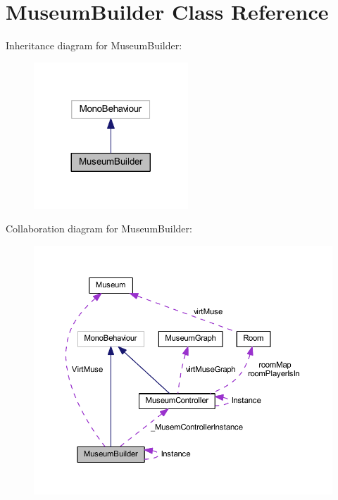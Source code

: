 \hypertarget{class_museum_builder}{}\section{Museum\+Builder Class Reference}
\label{class_museum_builder}


Inheritance diagram for Museum\+Builder\+:
\nopagebreak
\begin{figure}[H]
\begin{center}
\leavevmode
\includegraphics[width=164pt]{class_museum_builder__inherit__graph}
\end{center}
\end{figure}


Collaboration diagram for Museum\+Builder\+:
\nopagebreak
\begin{figure}[H]
\begin{center}
\leavevmode
\includegraphics[width=350pt]{class_museum_builder__coll__graph}
\end{center}
\end{figure}
